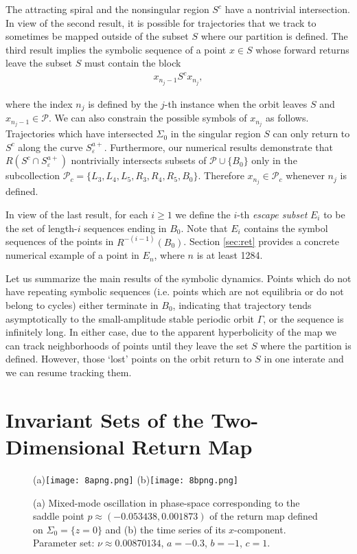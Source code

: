 \documentclass[aip, cha, sd, amsmath,amssymb, preprint]{revtex4-1}
\begin{document}
The attracting spiral and the nonsingular region $S^c$ have a nontrivial intersection. In view of the second result, it is possible for trajectories that we track to sometimes be mapped outside of the subset $S$ where our partition is defined. The third result implies the symbolic sequence of a point $x\in S$ whose forward returns leave the subset $S$ must contain the block
\begin{eqnarray*}
 x_{n_j-1} S^c x_{n_j},
\end{eqnarray*}

where the index $n_j$ is defined by the $j$-th instance when the orbit leaves $S$ and $x_{n_j-1} \in \mathcal{P}$. We can also constrain the possible symbols of $x_{n_j}$ as follows. Trajectories which have intersected $\Sigma_0$ in the singular region $S$ can only return to $S^c$ along the curve $S^{a+}_{ \varepsilon}$. Furthermore, our numerical results demonstrate that $R(S^c \cap S^{a+}_{ \varepsilon})$ nontrivially intersects subsets of $\mathcal{P}\cup\{B_0\}$ only in the subcollection $\mathcal{P}_c = \{L_3,L_4,L_5,R_3,R_4,R_5,B_0\}$. Therefore $x_{n_j} \in \mathcal{P}_c$ whenever $n_j$ is defined. 

In view of the last result, for each $i \geq 1$ we define the $i$-th {\it escape subset} $E_i$ to be the set of length-$i$ sequences ending in $B_0$. Note that $E_i$ contains the symbol sequences of the points in $R^{-(i-1)}(B_0)$. Section \ref{sec:ret} provides a concrete numerical example of a point in $E_{n}$, where $n$ is at least 1284. 

Let us summarize the main results of the symbolic dynamics. Points which do not have repeating symbolic sequences (i.e. points which are not equilibria or do not belong to cycles) either terminate in $B_0$, indicating that trajectory tends asymptotically to the small-amplitude stable periodic orbit $\Gamma$, or the sequence is infinitely long. In either case, due to the apparent hyperbolicity of the map we can track neighborhoods of points until they leave the set $S$ where the partition is defined. However, those `lost' points on the orbit return to $S$ in one interate and we can resume tracking them.

\section{\label{sec:homorbit2d} Invariant Sets of the Two-Dimensional Return Map}

\begin{figure}
(a)\texttt{[image: 8apng.png]}
(b)\texttt{[image: 8bpng.png]}
\caption{\label{fig:fporbit} (a) Mixed-mode oscillation in phase-space corresponding to the saddle point $p \approx (-0.053438, 0.001873)$ of the return map defined on $\Sigma_0 = \{z = 0\}$ and (b) the time series of its $x$-component. Parameter set: $\nu \approx 0.00870134$, $a = -0.3$, $b = -1$, $c = 1$.}
\end{figure}
\end{document}
